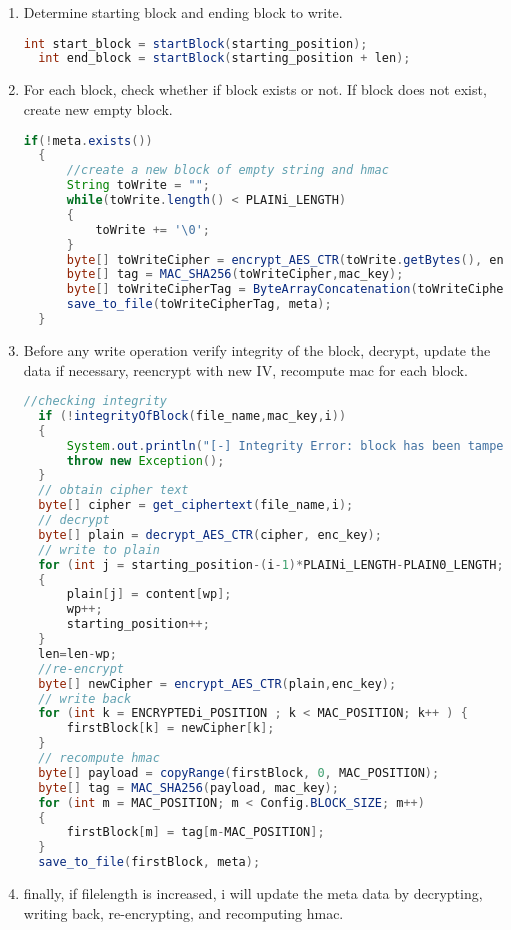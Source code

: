 \documentclass[a4paper,10pt]{article}
\begin{document}
\begin{enumerate}
  \item Determine starting block and ending block to write.
  \begin{lstlisting}[linewidth=\columnwidth,breaklines=true,language=Java]
  int start_block = startBlock(starting_position);
  int end_block = startBlock(starting_position + len);\end{lstlisting}
  \item For each block, check whether if block exists or not. If block does not exist, create new empty block.
  \begin{lstlisting}[linewidth=\columnwidth,breaklines=true,language=Java]
  if(!meta.exists())
  {
      //create a new block of empty string and hmac
      String toWrite = "";
      while(toWrite.length() < PLAINi_LENGTH)
      {
          toWrite += '\0';
      }
      byte[] toWriteCipher = encrypt_AES_CTR(toWrite.getBytes(), enc_key);
      byte[] tag = MAC_SHA256(toWriteCipher,mac_key);
      byte[] toWriteCipherTag = ByteArrayConcatenation(toWriteCipher,tag);
      save_to_file(toWriteCipherTag, meta);
  }\end{lstlisting}
  \item Before any write operation verify integrity of the block, decrypt, update the data if necessary, reencrypt with new IV, recompute mac for each block.
  \begin{lstlisting}[linewidth=\columnwidth,breaklines=true,language=Java]
  //checking integrity
  if (!integrityOfBlock(file_name,mac_key,i)) 
  {
      System.out.println("[-] Integrity Error: block has been tamper");
      throw new Exception();
  }
  // obtain cipher text
  byte[] cipher = get_ciphertext(file_name,i);
  // decrypt
  byte[] plain = decrypt_AES_CTR(cipher, enc_key);
  // write to plain
  for (int j = starting_position-(i-1)*PLAINi_LENGTH-PLAIN0_LENGTH; j < numByteToWrite; j++) 
  {                    
      plain[j] = content[wp]; 
      wp++;
      starting_position++;
  }
  len=len-wp;
  //re-encrypt
  byte[] newCipher = encrypt_AES_CTR(plain,enc_key);
  // write back
  for (int k = ENCRYPTEDi_POSITION ; k < MAC_POSITION; k++ ) {
      firstBlock[k] = newCipher[k];
  }
  // recompute hmac
  byte[] payload = copyRange(firstBlock, 0, MAC_POSITION);
  byte[] tag = MAC_SHA256(payload, mac_key);
  for (int m = MAC_POSITION; m < Config.BLOCK_SIZE; m++) 
  {
      firstBlock[m] = tag[m-MAC_POSITION];
  }
  save_to_file(firstBlock, meta);
  \end{lstlisting}
  \item finally, if filelength is increased, i will update the meta data by decrypting, writing back, re-encrypting, and recomputing hmac.

\end{enumerate}
\end{document}
